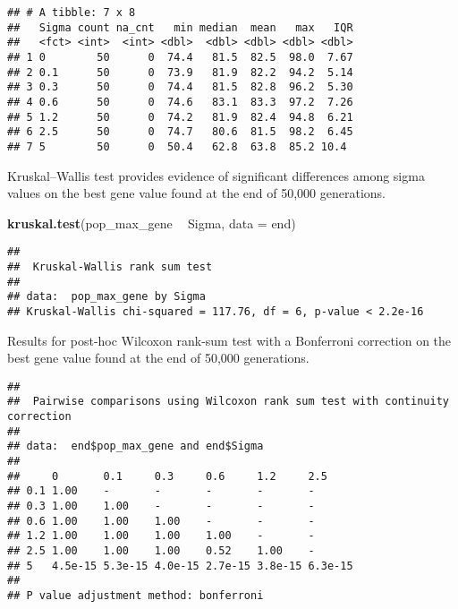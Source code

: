 \documentclass[]{book}
\newenvironment{Shaded}{\begin{snugshade}}{\end{snugshade}}
\newcommand{\DataTypeTok}[1]{\textcolor[rgb]{0.13,0.29,0.53}{#1}}
\newcommand{\KeywordTok}[1]{\textcolor[rgb]{0.13,0.29,0.53}{\textbf{#1}}}
\newcommand{\NormalTok}[1]{#1}
\newcommand{\OperatorTok}[1]{\textcolor[rgb]{0.81,0.36,0.00}{\textbf{#1}}}
\newcommand{\OtherTok}[1]{\textcolor[rgb]{0.56,0.35,0.01}{#1}}
\newcommand{\StringTok}[1]{\textcolor[rgb]{0.31,0.60,0.02}{#1}}
\begin{document}
\begin{verbatim}
## # A tibble: 7 x 8
##   Sigma count na_cnt   min median  mean   max   IQR
##   <fct> <int>  <int> <dbl>  <dbl> <dbl> <dbl> <dbl>
## 1 0        50      0  74.4   81.5  82.5  98.0  7.67
## 2 0.1      50      0  73.9   81.9  82.2  94.2  5.14
## 3 0.3      50      0  74.4   81.5  82.8  96.2  5.30
## 4 0.6      50      0  74.6   83.1  83.3  97.2  7.26
## 5 1.2      50      0  74.2   81.9  82.4  94.8  6.21
## 6 2.5      50      0  74.7   80.6  81.5  98.2  6.45
## 7 5        50      0  50.4   62.8  63.8  85.2 10.4
\end{verbatim}

Kruskal--Wallis test provides evidence of significant differences among sigma values on the best gene value found at the end of 50,000 generations.

\begin{Shaded}
\begin{Highlighting}[]
\KeywordTok{kruskal.test}\NormalTok{(pop_max_gene }\OperatorTok{~}\StringTok{ }\NormalTok{Sigma, }\DataTypeTok{data =}\NormalTok{ end)}
\end{Highlighting}
\end{Shaded}

\begin{verbatim}
## 
##  Kruskal-Wallis rank sum test
## 
## data:  pop_max_gene by Sigma
## Kruskal-Wallis chi-squared = 117.76, df = 6, p-value < 2.2e-16
\end{verbatim}

Results for post-hoc Wilcoxon rank-sum test with a Bonferroni correction on the best gene value found at the end of 50,000 generations.

\begin{Shaded}
\end{Shaded}

\begin{verbatim}
## 
##  Pairwise comparisons using Wilcoxon rank sum test with continuity correction 
## 
## data:  end$pop_max_gene and end$Sigma 
## 
##     0       0.1     0.3     0.6     1.2     2.5    
## 0.1 1.00    -       -       -       -       -      
## 0.3 1.00    1.00    -       -       -       -      
## 0.6 1.00    1.00    1.00    -       -       -      
## 1.2 1.00    1.00    1.00    1.00    -       -      
## 2.5 1.00    1.00    1.00    0.52    1.00    -      
## 5   4.5e-15 5.3e-15 4.0e-15 2.7e-15 3.8e-15 6.3e-15
## 
## P value adjustment method: bonferroni
\end{verbatim}
\end{document}
